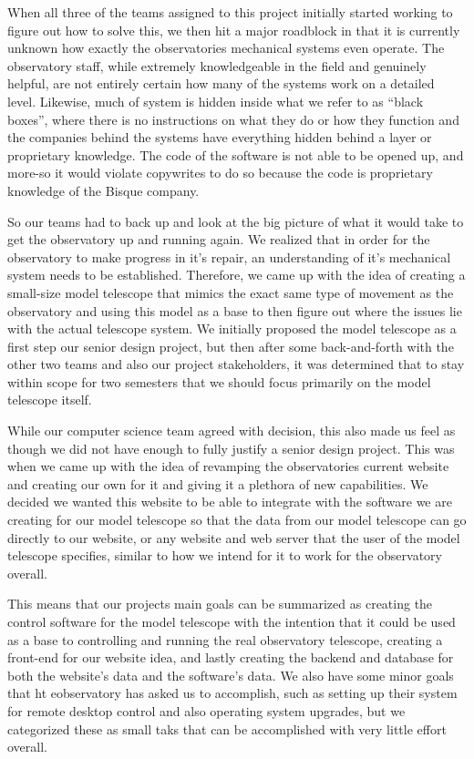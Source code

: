 \documentclass[12pt]{report}
\begin{document}
When all three of the teams assigned to this project initially started working to figure out how to solve this, we then hit a major roadblock in that it is currently unknown how exactly the observatories mechanical systems even operate. The observatory staff, while extremely knowledgeable in the field and genuinely helpful, are not entirely certain how many of the systems work on a detailed level. Likewise, much of system is hidden inside what we refer to as “black boxes”, where there is no instructions on what they do or how they function and the companies behind the systems have everything hidden behind a layer or proprietary knowledge. The code of the software is not able to be opened up, and more-so it would violate copywrites to do so because the code is proprietary knowledge of the Bisque company.

So our teams had to back up and look at the big picture of what it would take to get the observatory up and running again. We realized that in order for the observatory to make progress in it’s repair, an understanding of it’s mechanical system needs to be established. Therefore, we came up with the idea of creating a small-size model telescope that mimics the exact same type of movement as the observatory and using this model as a base to then figure out where the issues lie with the actual telescope system. We initially proposed the model telescope as a first step our senior design project, but then after some back-and-forth with the other two teams and also our project stakeholders, it was determined that to stay within scope for two semesters that we should focus primarily on the model telescope itself.

While our computer science team agreed with decision, this also made us feel as though we did not have enough to fully justify a senior design project. This was when we came up with the idea of revamping the observatories current website and creating our own for it and giving it a plethora of new capabilities. We decided we wanted this website to be able to integrate with the software we are creating for our model telescope so that the data from our model telescope can go directly to our website, or any website and web server that the user of the model telescope specifies, similar to how we intend for it to work for the observatory overall.

This means that our projects main goals can be summarized as creating the control software for the model telescope with the intention that it could be used as a base to controlling and running the real observatory telescope, creating a front-end for our website idea, and lastly creating the backend and database for both the website’s data and the software’s data. We also have some minor goals that ht eobservatory has asked us to accomplish, such as setting up their system for remote desktop control and also operating system upgrades, but we categorized these as small taks that can be accomplished with very little effort overall.
\end{document}
